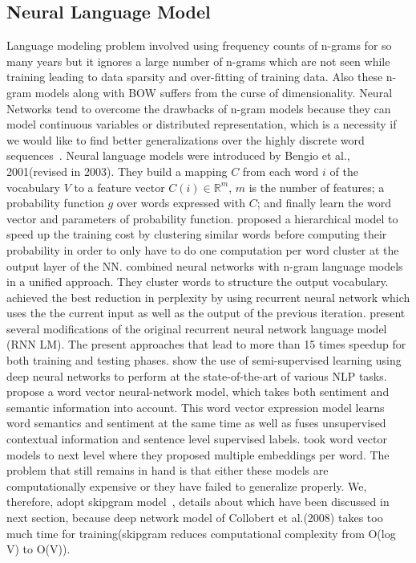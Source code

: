 \documentclass[11pt,a4paper]{article}
\begin{document}
\subsection{Neural Language Model}
Language modeling problem involved using frequency counts of n-grams for so many years but it ignores a large number of n-grams which are not seen while training leading to data sparsity and over-fitting of training data. Also these n-gram models along with BOW suffers from the curse of dimensionality. Neural Networks tend to overcome the drawbacks of n-gram models because they can model continuous variables or distributed representation, which is a necessity if we would like to find better generalizations over the highly discrete word sequences~\cite{Bengio:03}. 
Neural language models were introduced by Bengio et al., 2001(revised in 2003\cite{Bengio:03}). They build a mapping $C$ from each word $i$ of the vocabulary $V$ to a feature vector $C(i) \in \mathbb{R}^m$, $m$ is the number of features; a probability function $g$ over words expressed with $C$; and finally learn the word vector and parameters of probability function.
\cite{Morin:05} proposed a hierarchical model to speed up the training cost by clustering similar words before computing their probability in order to only have to do one computation per word cluster
at the output layer of the NN.
\cite{Le:11} combined neural networks with n-gram language models in a unified approach. They cluster words to structure the output vocabulary. \cite{Mikolov:10} achieved the best reduction in perplexity by using recurrent neural network which uses the the current input as well as the output of the previous iteration.
\cite{Mikolov:11} present several modifications of the original recurrent neural network language model (RNN LM). The present approaches that lead to more than 15 times speedup for both training and testing phases.
\cite{Collobert:08} show the use of semi-supervised learning using deep neural networks to perform at the state-of-the-art of various NLP tasks. \cite{Wang:14} propose a word vector neural-network model, which takes both sentiment and semantic information into account. This word vector expression model learns word semantics and sentiment at the same time as well as fuses unsupervised contextual information and sentence level supervised labels. \cite{Neelakantan:14} took word vector models to next level where they proposed multiple embeddings per word.
The problem that still remains in hand is that either these models are computationally expensive or they have failed to generalize properly. We, therefore, adopt skipgram model~\cite{Mikolov:13a}, details about which have been discussed in next section, because deep network model of Collobert et al.(2008) takes too much time for training(skipgram reduces computational complexity from O(log V) to O(V)).
\end{document}
